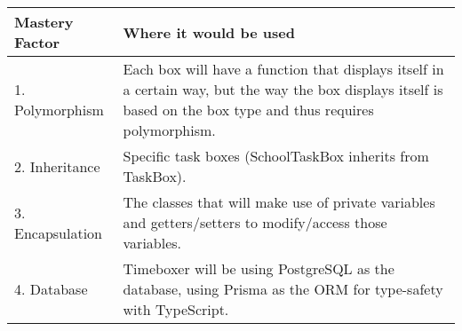\documentclass[12pt, notitlepage]{report}
\begin{document}
\noindent\begin{tabularx}{\textwidth}{|l|X|}
	\hline
	\textbf{Mastery Factor}
	 & \textbf{Where it would be used}
	\\\hline
	1. Polymorphism
	 & Each box will have a function that displays itself in a certain way, but the way the box displays itself is based on the box type and thus requires polymorphism.
	\\\hline
	2. Inheritance
	 & Specific task boxes (SchoolTaskBox inherits from TaskBox).
	\\\hline
	3. Encapsulation
	 & The classes that will make use of private variables and getters/setters to modify/access those variables.
	\\\hline
	4. Database
	 & Timeboxer will be using PostgreSQL as the database, using Prisma as the ORM for type-safety with TypeScript.
	\\\hline
\end{tabularx}
\end{document}
